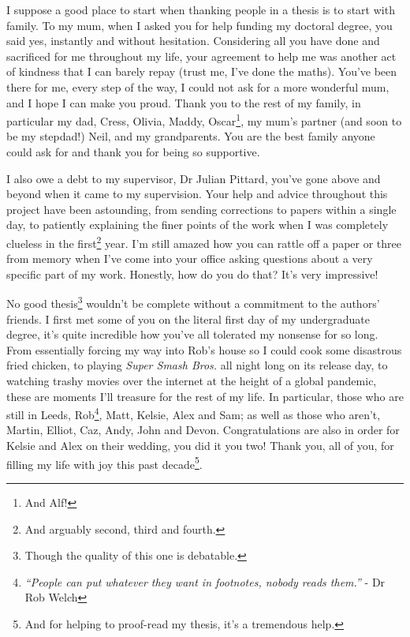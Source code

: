 

\begin{acknowledgements}      %

\setlength{\parindent}{17.62482pt}
\setlength{\parskip}{0.0pt plus 1.0pt}


I suppose a good place to start when thanking people in a thesis is to start with family.
To my mum, when I asked you for help funding my doctoral degree, you said yes, instantly and without hesitation.
Considering all you have done and sacrificed for me throughout my life, your agreement to help me was another act of kindness that I can barely repay (trust me, I've done the maths).
You've been there for me, every step of the way, I could not ask for a more wonderful mum, and I hope I can make you proud.
Thank you to the rest of my family, in particular my dad, Cress, Olivia, Maddy, Oscar\footnote{And Alf!}, my mum's partner (and soon to be my stepdad!) Neil, and my grandparents.
You are the best family anyone could ask for and thank you for being so supportive.

I also owe a debt to my supervisor, Dr Julian Pittard, you've gone above and beyond when it came to my supervision.
Your help and advice throughout this project have been astounding, from sending corrections to papers within a single day, to patiently explaining the finer points of the work when I was completely clueless in the first\footnote{And arguably second, third and fourth.} year.
I'm still amazed how you can rattle off a paper or three from memory when I've come into your office asking questions about a very specific part of my work.
Honestly, how do you do that? It's very impressive!

No good thesis\footnote{Though the quality of this one is debatable.} wouldn't be complete without a commitment to the authors' friends.
I first met some of you on the literal first day of my undergraduate degree, it's quite incredible how you've all tolerated my nonsense for so long.
From essentially forcing my way into Rob's house so I could cook some disastrous fried chicken, to playing \textit{Super Smash Bros.} all night long on its release day, to watching trashy movies over the internet at the height of a global pandemic, these are moments I'll treasure for the rest of my life.
In particular, those who are still in Leeds, Rob\footnote{\emph{``People can put whatever they want in footnotes, nobody reads them.''} - Dr Rob Welch}, Matt, Kelsie, Alex and Sam; as well as those who aren't, Martin, Elliot, Caz, Andy, John and Devon.
Congratulations are also in order for Kelsie and Alex on their wedding, you did it you two!
Thank you, all of you, for filling my life with joy this past decade\footnote{And for helping to proof-read my thesis, it's a tremendous help.}.


\end{acknowledgements}
